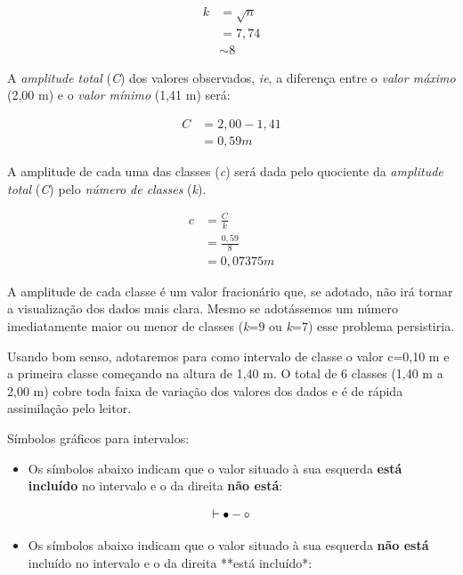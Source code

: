 \documentclass[
]{book}
\providecommand{\tightlist}{%
  \setlength{\itemsep}{0pt}\setlength{\parskip}{0pt}}
\begin{document}
\begin{align*}
k & =\sqrt{n} \\
 & = 7,74 \\
 & \sim 8 
\end{align*}

A \emph{amplitude total} (\emph{C}) dos valores observados, \emph{ie}, a diferença entre o \emph{valor máximo} (2,00 m) e o \emph{valor mínimo} (1,41 m) será:

\begin{align*}
C & =2,00-1,41 \\
 & =0,59 m 
\end{align*}

A amplitude de cada uma das classes (\emph{c}) será dada pelo quociente da \emph{amplitude total} (\emph{C}) pelo \emph{número de classes} (\emph{k}).

\hfill\break

\begin{align*}
c & = \frac{C}{k} \\
  & = \frac{0,59}{8}\\ 
  & = 0,07375 m
\end{align*}

A amplitude de cada classe é um valor fracionário que, se adotado, não irá tornar a visualização dos dados mais clara. Mesmo se adotássemos um número imediatamente maior ou menor de classes (\emph{k}=9 ou \emph{k}=7) esse problema persistiria.

Usando bom senso, adotaremos para como intervalo de classe o valor c=0,10 m e a primeira classe começando na altura de 1,40 m.
O total de 6 classes (1,40 m a 2,00 m) cobre toda faixa de variação dos valores dos dados e é de rápida assimilação pelo leitor.

Símbolos gráficos para intervalos:

\begin{itemize}
\tightlist
\item
  Os símbolos abaixo indicam que o valor situado à sua esquerda \textbf{está incluído} no intervalo e o da direita \textbf{não está}:
\end{itemize}

\[
\vdash \\
{\bullet}-{\circ}
\]

\begin{itemize}
\tightlist
\item
  Os símbolos abaixo indicam que o valor situado à sua esquerda \textbf{não está} incluído no intervalo e o da direita **está incluído*:
\end{itemize}
\end{document}
